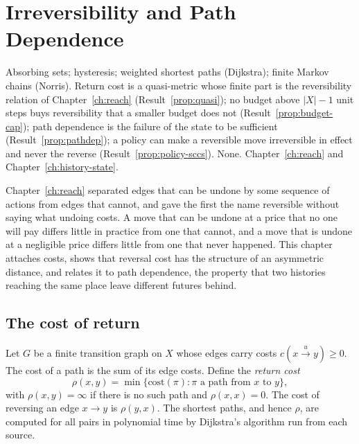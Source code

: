 \chapter{Irreversibility and Path Dependence}\label{ch:irreversibility}
{Absorbing sets; hysteresis; weighted shortest paths (Dijkstra); finite Markov chains (Norris).}
{Return cost is a quasi-metric whose finite part is the reversibility relation of Chapter~\ref{ch:reach} (Result~\ref{prop:quasi}); no budget above $|X|-1$ unit steps buys reversibility that a smaller budget does not (Result~\ref{prop:budget-cap}); path dependence is the failure of the state to be sufficient (Result~\ref{prop:pathdep}); a policy can make a reversible move irreversible in effect and never the reverse (Result~\ref{prop:policy-sccs}).}
{None.}
{Chapter~\ref{ch:reach} and Chapter~\ref{ch:history-state}.}

Chapter~\ref{ch:reach} separated edges that can be undone by some sequence of actions from edges that cannot, and gave the first the name reversible without saying what undoing costs. A move that can be undone at a price that no one will pay differs little in practice from one that cannot, and a move that is undone at a negligible price differs little from one that never happened. This chapter attaches costs, shows that reversal cost has the structure of an asymmetric distance, and relates it to path dependence, the property that two histories reaching the same place leave different futures behind.

\section{The cost of return}

Let $G$ be a finite transition graph on $X$ whose edges carry costs $c(x\xrightarrow{u}y)\ge0$. The cost of a path is the sum of its edge costs. Define the \emph{return cost}
\[
\rho(x,y)=\min\{\text{cost}(\pi):\pi\text{ a path from }x\text{ to }y\},
\]
with $\rho(x,y)=\infty$ if there is no such path and $\rho(x,x)=0$.
The cost of reversing an edge $x\to y$ is $\rho(y,x)$. The shortest paths, and hence $\rho$, are computed for all pairs in polynomial time by Dijkstra's algorithm run from each source.

